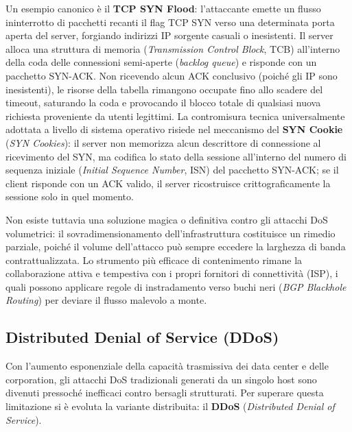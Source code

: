 \documentclass[../../main.tex]{subfiles}
\begin{document}
Un esempio canonico è il \textbf{TCP SYN Flood}: l'attaccante emette un flusso ininterrotto di pacchetti recanti il flag TCP SYN verso una determinata porta aperta del server, forgiando indirizzi IP sorgente casuali o inesistenti. Il server alloca una struttura di memoria (\textit{Transmission Control Block}, TCB) all'interno della coda delle connessioni semi-aperte (\textit{backlog queue}) e risponde con un pacchetto SYN-ACK. Non ricevendo alcun ACK conclusivo (poiché gli IP sono inesistenti), le risorse della tabella rimangono occupate fino allo scadere del timeout, saturando la coda e provocando il blocco totale di qualsiasi nuova richiesta proveniente da utenti legittimi. La contromisura tecnica universalmente adottata a livello di sistema operativo risiede nel meccanismo del \textbf{SYN Cookie} (\textit{SYN Cookies}): il server non memorizza alcun descrittore di connessione al ricevimento del SYN, ma codifica lo stato della sessione all'interno del numero di sequenza iniziale (\textit{Initial Sequence Number}, ISN) del pacchetto SYN-ACK; se il client risponde con un ACK valido, il server ricostruisce crittograficamente la sessione solo in quel momento.

Non esiste tuttavia una soluzione magica o definitiva contro gli attacchi DoS volumetrici: il sovradimensionamento dell'infrastruttura costituisce un rimedio parziale, poiché il volume dell'attacco può sempre eccedere la larghezza di banda contrattualizzata. Lo strumento più efficace di contenimento rimane la collaborazione attiva e tempestiva con i propri fornitori di connettività (ISP), i quali possono applicare regole di instradamento verso buchi neri (\textit{BGP Blackhole Routing}) per deviare il flusso malevolo a monte.

\subsection{Distributed Denial of Service (DDoS)}
\label{subsec:ddos}

Con l'aumento esponenziale della capacità trasmissiva dei data center e delle corporation, gli attacchi DoS tradizionali generati da un singolo host sono divenuti pressoché inefficaci contro bersagli strutturati. Per superare questa limitazione si è evoluta la variante distribuita: il \textbf{DDoS} (\textit{Distributed Denial of Service}).
\end{document}
